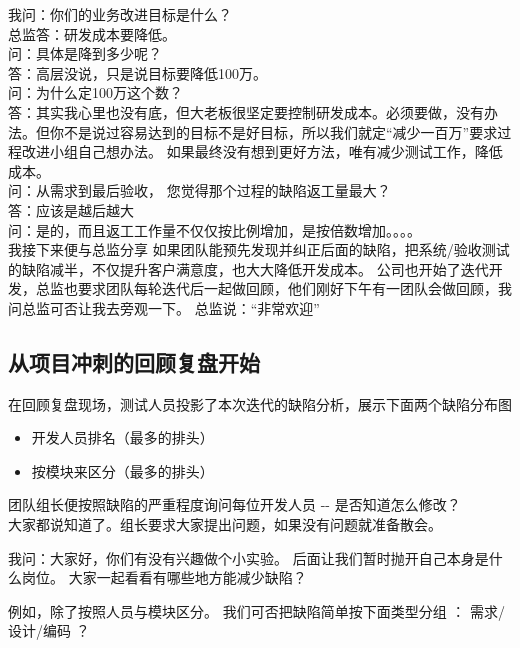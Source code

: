 我问：你们的业务改进目标是什么？\\
总监答：研发成本要降低。\\
问：具体是降到多少呢？\\
答：高层没说，只是说目标要降低100万。\\
问：为什么定100万这个数？\\
答：其实我心里也没有底，但大老板很坚定要控制研发成本。必须要做，没有办法。但你不是说过容易达到的目标不是好目标，所以我们就定“减少一百万”要求过程改进小组自己想办法。 如果最终没有想到更好方法，唯有减少测试工作，降低成本。\\

问：从需求到最后验收， 您觉得那个过程的缺陷返工量最大？\\
答：应该是越后越大\\
问：是的，而且返工工作量不仅仅按比例增加，是按倍数增加。。。。\\

我接下来便与总监分享 如果团队能预先发现并纠正后面的缺陷，把系统/验收测试的缺陷减半，不仅提升客户满意度，也大大降低开发成本。 公司也开始了迭代开发，总监也要求团队每轮迭代后一起做回顾，他们刚好下午有一团队会做回顾，我问总监可否让我去旁观一下。
总监说：“非常欢迎” \\


\hypertarget{ux4eceux9879ux76eeux51b2ux523aux7684ux56deux987eux590dux76d8ux5f00ux59cb}{%
\subsection{从项目冲刺的回顾复盘开始}\label{ux4eceux9879ux76eeux51b2ux523aux7684ux56deux987eux590dux76d8ux5f00ux59cb}}

在回顾复盘现场，测试人员投影了本次迭代的缺陷分析，展示下面两个缺陷分布图
\begin{itemize}
\tightlist
\item
  开发人员排名（最多的排头）
\item
  按模块来区分（最多的排头）
\end{itemize}

团队组长便按照缺陷的严重程度询问每位开发人员 -\/- 是否知道怎么修改？\\
大家都说知道了。组长要求大家提出问题，如果没有问题就准备散会。

我问：大家好，你们有没有兴趣做个小实验。
后面让我们暂时抛开自己本身是什么岗位。
大家一起看看有哪些地方能减少缺陷？

例如，除了按照人员与模块区分。 我们可否把缺陷简单按下面类型分组 ：
需求/设计/编码 ？

